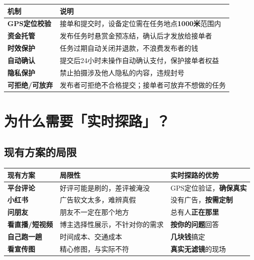 \documentclass[12pt, a4paper]{article}
\begin{document}
\begin{table}[H]
\centering
\renewcommand{\arraystretch}{1.4}
\begin{tabularx}{\textwidth}{>{\bfseries}l X}
\toprule
机制 & 说明 \\
\midrule
GPS定位校验 & 接单和提交时，设备定位需在任务地点\textbf{1000米}范围内 \\
资金托管 & 发布任务时悬赏金预冻结，确认后才发放给接单者 \\
时效保护 & 任务过期自动关闭并退款，不浪费发布者的钱 \\
自动确认 & 提交后24小时未操作自动确认支付，保护接单者权益 \\
隐私保护 & 禁止拍摄涉及他人隐私的内容，违规封号 \\
可拒绝/可放弃 & 发布者可拒绝不合格提交；接单者可放弃不想做的任务 \\
\bottomrule
\end{tabularx}
\end{table}

\newpage

\section{为什么需要「实时探路」？}

\subsection{现有方案的局限}

\begin{table}[H]
\centering
\renewcommand{\arraystretch}{1.4}
\begin{tabularx}{\textwidth}{>{\bfseries}l X X}
\toprule
现有方案 & 局限性 & 实时探路的优势 \\
\midrule
平台评论 & 好评可能是刷的，差评被淹没 & GPS定位验证，\textbf{确保真实} \\
小红书 & 广告软文太多，难辨真假 & 没有广告，\textbf{按需定制} \\
问朋友 & 朋友不一定在那个地方 & 总有人\textbf{正在那里} \\
看直播/短视频 & 博主选择性展示，不针对你的需求 & \textbf{按你的问题}回答 \\
自己跑一趟 & 时间成本、交通成本 & \textbf{几块钱}搞定 \\
看宣传图 & 精心修图，与实际不符 & \textbf{真实无滤镜}的现场 \\
\bottomrule
\end{tabularx}
\end{table}
\end{document}
